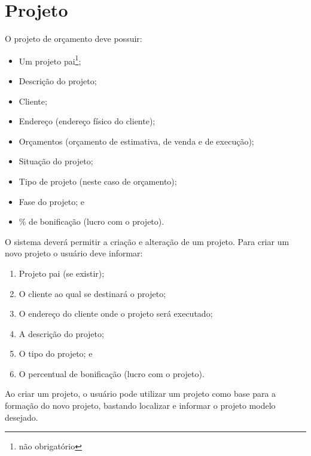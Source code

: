 \chapter{Projeto}
O projeto de orçamento deve possuir:

\begin{itemize}
	\item Um projeto pai\footnote{não obrigatório};
	\item Descrição do projeto;
	\item Cliente;
	\item Endereço (endereço físico do cliente);
	\item Orçamentos (orçamento de estimativa, de venda e de execução);
	\item Situação do projeto;
	\item Tipo de projeto (neste caso de orçamento);
	\item Fase do projeto; e
	\item \% de bonificação (lucro com o projeto).
\end{itemize}

O sistema deverá permitir a criação e alteração de um projeto. Para criar um novo projeto o usuário deve informar:
\begin{enumerate}
	\item Projeto pai (se existir);
	\item O cliente ao qual se destinará o projeto;
	\item O endereço do cliente onde o projeto será executado;
	\item A descrição do projeto;
	\item O tipo do projeto; e
	\item O percentual de bonificação (lucro com o projeto).
\end{enumerate}

Ao criar um projeto, o usuário pode utilizar um projeto como base para a formação do novo projeto, bastando localizar e informar o projeto modelo desejado.